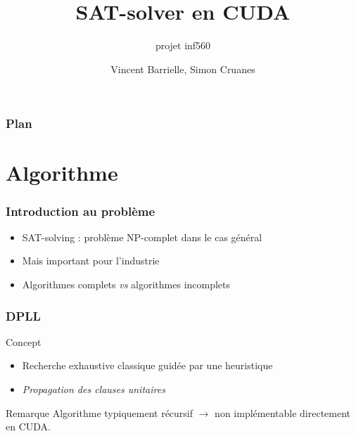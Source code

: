 \documentclass{beamer}
\newcommand{\cuda}{\textsc{CUDA}}
\begin{document}

\author{Vincent Barrielle, Simon Cruanes}
\lstset{language=C,showstringspaces=false}	
\title{SAT-solver en \cuda}
\subtitle{projet inf560}



\begin{frame}
\titleframe
\titlepage
\end{frame}

\begin{frame}
\frametitle{Plan}
\small \tableofcontents%
\normalsize
\end{frame}

\section{Algorithme}
\begin{frame}
\frametitle{Introduction au problème}
\begin{itemize}
    \item SAT-solving : problème NP-complet dans le cas général
    \pause
    \item Mais important pour l'industrie
    \pause
    \item Algorithmes complets \emph{vs} algorithmes incomplets %
\end{itemize}
\end{frame}

\begin{frame}
\frametitle{DPLL}
\begin{block}{Concept}
\begin{itemize}
    \item Recherche exhaustive classique guidée par une heuristique
    \item \emph{Propagation des clauses unitaires}
\end{itemize}
    \pause
\end{block}

\begin{block}{Remarque}
    Algorithme typiquement récursif $\rightarrow$ non implémentable directement en \cuda.
\end{block}
\end{frame}


\medskip
\end{document}
